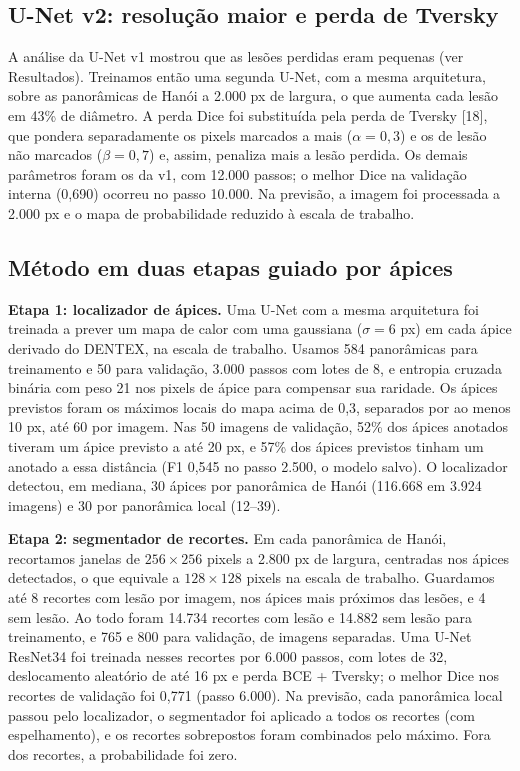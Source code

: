 \documentclass[twocolumn]{article}
\begin{document}
\subsection{U-Net v2: resolução maior e perda de Tversky}

A análise da U-Net v1 mostrou que as lesões perdidas eram pequenas (ver Resultados). Treinamos então uma segunda U-Net, com a mesma arquitetura, sobre as panorâmicas de Hanói a 2.000 px de largura, o que aumenta cada lesão em 43\% de diâmetro. A perda Dice foi substituída pela perda de Tversky [18], que pondera separadamente os pixels marcados a mais ($\alpha = 0{,}3$) e os de lesão não marcados ($\beta = 0{,}7$) e, assim, penaliza mais a lesão perdida. Os demais parâmetros foram os da v1, com 12.000 passos; o melhor Dice na validação interna (0,690) ocorreu no passo 10.000. Na previsão, a imagem foi processada a 2.000 px e o mapa de probabilidade reduzido à escala de trabalho.

\subsection{Método em duas etapas guiado por ápices}

\textbf{Etapa 1: localizador de ápices.} Uma U-Net com a mesma arquitetura foi treinada a prever um mapa de calor com uma gaussiana ($\sigma = 6$ px) em cada ápice derivado do DENTEX, na escala de trabalho. Usamos 584 panorâmicas para treinamento e 50 para validação, 3.000 passos com lotes de 8, e entropia cruzada binária com peso 21 nos pixels de ápice para compensar sua raridade. Os ápices previstos foram os máximos locais do mapa acima de 0,3, separados por ao menos 10 px, até 60 por imagem. Nas 50 imagens de validação, 52\% dos ápices anotados tiveram um ápice previsto a até 20 px, e 57\% dos ápices previstos tinham um anotado a essa distância (F1 0,545 no passo 2.500, o modelo salvo). O localizador detectou, em mediana, 30 ápices por panorâmica de Hanói (116.668 em 3.924 imagens) e 30 por panorâmica local (12--39).

\textbf{Etapa 2: segmentador de recortes.} Em cada panorâmica de Hanói, recortamos janelas de $256 \times 256$ pixels a 2.800 px de largura, centradas nos ápices detectados, o que equivale a $128 \times 128$ pixels na escala de trabalho. Guardamos até 8 recortes com lesão por imagem, nos ápices mais próximos das lesões, e 4 sem lesão. Ao todo foram 14.734 recortes com lesão e 14.882 sem lesão para treinamento, e 765 e 800 para validação, de imagens separadas. Uma U-Net ResNet34 foi treinada nesses recortes por 6.000 passos, com lotes de 32, deslocamento aleatório de até 16 px e perda BCE + Tversky; o melhor Dice nos recortes de validação foi 0,771 (passo 6.000). Na previsão, cada panorâmica local passou pelo localizador, o segmentador foi aplicado a todos os recortes (com espelhamento), e os recortes sobrepostos foram combinados pelo máximo. Fora dos recortes, a probabilidade foi zero.
\end{document}
